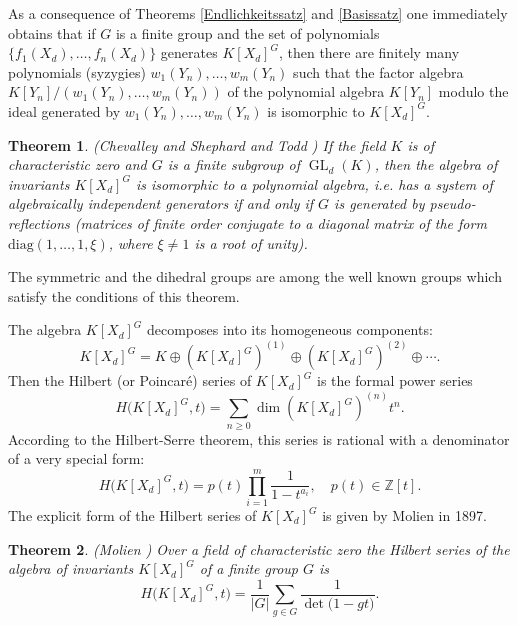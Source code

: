 \documentclass{amsart}
\newtheorem{theorem}{Theorem}[section]
\theoremstyle{definition}
\DeclareMathOperator{\GL}{GL}
\begin{document}
As a consequence of Theorems \ref{Endlichkeitssatz} and \ref{Basissatz} one immediately obtains that if $G$ is a finite group
and the set of polynomials $\{f_1(X_d),\ldots,f_n(X_d)\}$ generates $K[X_d]^G$,
then there are finitely many polynomials (syzygies) $w_1(Y_n),\ldots,w_m(Y_n)$ such that the factor algebra $K[Y_n]/(w_1(Y_n),\ldots,w_m(Y_n))$
of the polynomial algebra $K[Y_n]$ modulo the ideal generated by $w_1(Y_n),\ldots,w_m(Y_n)$ is isomorphic to $K[X_d]^G$.

\begin{theorem}\label{Chevalley-Shephard-Todd} {\rm (Chevalley \cite{Che} and Shephard and Todd \cite{ShT})}
If the field $K$ is of characteristic zero and $G$ is a finite subgroup of $\GL_d(K)$, then the algebra of invariants $K[X_d]^G$ is isomorphic to a polynomial algebra,
i.e. has a system of algebraically independent generators if and only if $G$ is generated by pseudo-reflections
(matrices of finite order conjugate to a diagonal matrix of the form $\mathrm{diag}(1,\dots,1,\xi)$, where $\xi\neq  1$ is a root of unity).
\end{theorem}

The symmetric and the dihedral groups are among the well known groups which satisfy the conditions of this theorem.

The algebra $K[X_d]^G$ decomposes into its homogeneous components:
\[
K[X_d]^G=K\oplus \left(K[X_d]^G\right)^{(1)} \oplus \left(K[X_d]^G\right)^{(2)} \oplus \cdots.
\]
Then the Hilbert (or Poincar\'e) series of $K[X_d]^G$ is the formal power series
\[
H\big(K[X_d]^G,t\big)=\sum_{n\geq 0}\dim \left(K[X_d]^G\right)^{(n)}t^n.
\]
According to the Hilbert-Serre theorem, this series is rational with a denominator of a very special form:
\[
H\big(K[X_d]^G,t\big) = p(t) \prod_{i=1}^m\frac{1}{1-t^{a_i}},\quad p(t)\in{\mathbb Z}[t].
\]
The explicit form of the Hilbert series of $K[X_d]^G$ is given by Molien in 1897.

\begin{theorem}\label{Molien formula} {\rm (Molien \cite{Mo})}
Over a field of characteristic zero the Hilbert series of the algebra of invariants $K[X_d]^G$ of a finite group $G$ is
\[
H\big(K[X_d]^G,t\big)=\frac{1}{\vert G\vert}\sum_{g\in G}\frac{1}{\det\big(1-gt\big)}.
\]
\end{theorem}
\end{document}
